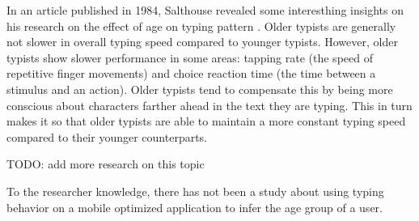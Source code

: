 In an article published in 1984, Salthouse revealed some interesthing insights on his research on the effect of age on typing pattern \cite{Salthouse1984}.
Older typists are generally not slower in overall typing speed compared to younger typists.
However, older typists show slower performance in some areas: tapping rate (the speed of repetitive finger movements) and choice reaction time (the time between a stimulus and an action).
Older typists tend to compensate this by being more conscious about characters farther ahead in the text they are typing.
This in turn makes it so that older typists are able to maintain a more constant typing speed compared to their younger counterparts.

TODO: add more research on this topic

To the researcher knowledge, there has not been a study about using typing behavior on a mobile optimized application to infer the age group of a user.